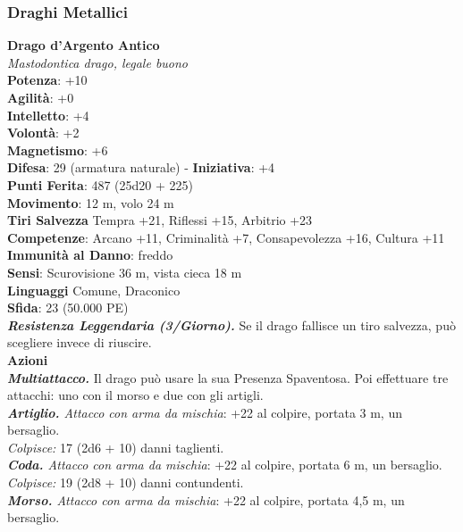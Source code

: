 \begin{multicols}{2}
\subsubsection{Draghi Metallici}

\medskip\textbf{Drago d'Argento Antico}\\
\emph{Mastodontica drago, legale buono}\\
\textbf{Potenza}: +10\\
\textbf{Agilità}: +0\\
\textbf{Intelletto}: +4\\
\textbf{Volontà}: +2\\
\textbf{Magnetismo}: +6\\
\textbf{Difesa}: 29 (armatura naturale) - \textbf{Iniziativa}: +4\\
\textbf{Punti Ferita}: 487 (25d20 + 225) \\
\textbf{Movimento}: 12 m, volo 24 m\\
\textbf{Tiri Salvezza} Tempra +21, Riflessi +15, Arbitrio +23\\
\textbf{Competenze}: Arcano +11, Criminalità +7, Consapevolezza +16, Cultura +11\\
\textbf{Immunità al Danno}: freddo\\
\textbf{Sensi}: Scurovisione 36 m, vista cieca 18 m\\
\textbf{Linguaggi} Comune, Draconico\\
\textbf{Sfida}: 23 (50.000 PE)\smallskip\\
\emph{\textbf{Resistenza Leggendaria (3/Giorno).}} Se il drago fallisce un tiro salvezza, può scegliere invece di riuscire.\\
\smallskip\textbf{Azioni} \\
\emph{\textbf{Multiattacco.}} Il drago può usare la sua Presenza Spaventosa. Poi effettuare tre attacchi: uno con il morso e due con gli artigli.\\
\emph{\textbf{Artiglio.} Attacco con arma da mischia}: +22 al colpire, portata 3 m, un bersaglio.\\
\emph{Colpisce:} 17 (2d6 + 10) danni taglienti.\\
\emph{\textbf{Coda.} Attacco con arma da mischia}: +22 al colpire, portata 6 m, un bersaglio.\\
\emph{Colpisce:} 19 (2d8 + 10) danni contundenti. \\
\emph{\textbf{Morso.} Attacco con arma da mischia}: +22 al colpire, portata 4,5 m, un bersaglio.\\

\end{multicols}
